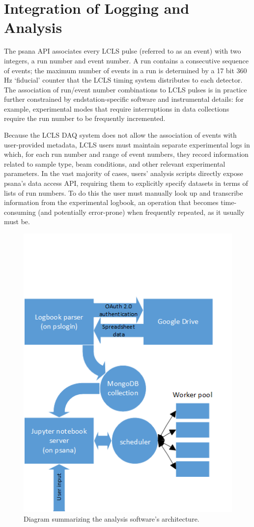 \section{Integration of Logging and Analysis}
The psana API associates every LCLS pulse (referred to as an event) with two integers, a run number and event number. \cite{damiani2016linac} A run contains a consecutive sequence of events; the maximum number of events in a run is determined by a 17 bit 360 Hz `fiducial' counter that the LCLS timing system distributes to each detector. The association of run/event number combinations to LCLS pulses is in practice further constrained by endstation-specific software and instrumental details: for example, experimental modes that require interruptions in data collections require the run number to be frequently incremented. 

Because the LCLS DAQ system does not allow the association of events with user-provided metadata, LCLS users must maintain separate experimental logs in which, for each run number and range of event numbers, they record information related to sample type, beam conditions, and other relevant experimental parameters.  In the vast majority of cases, users' analysis scripts directly expose psana's data access API, requiring them to explicitly specify datasets in terms of lists of run numbers. To do this the user must manually look up and transcribe information from the experimental logbook, an operation that becomes time-consuming (and potentially error-prone) when frequently repeated, as it usually must be.

\begin{figure}[h] \label{uwxap_block}
\caption{Diagram summarizing the analysis software's architecture.}
\centering
\includegraphics[scale=0.90]{../Figures/UWXAP_block_diagram.png}
\end{figure}

